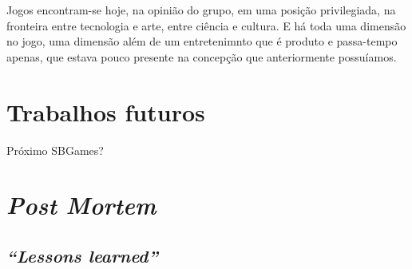 Jogos encontram-se hoje, na opinião do grupo, em uma posição
privilegiada, na fronteira entre tecnologia e arte, entre ciência e
cultura. E há toda uma dimensão no jogo, uma dimensão além de um
entretenimnto que é produto e passa-tempo apenas, que estava pouco
presente na concepção que anteriormente possuíamos.

\section{Trabalhos futuros}

Próximo SBGames?

\section{\emph{Post Mortem}}

\subsection{\emph{``Lessons learned''}}


